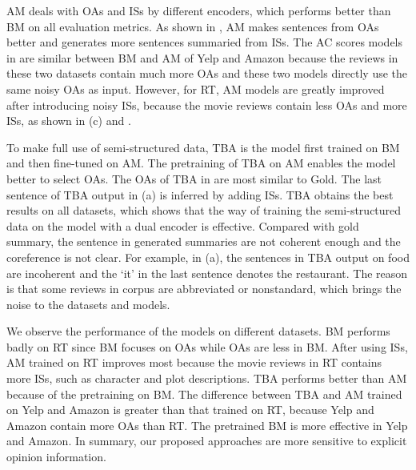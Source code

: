 AM deals with OAs and ISs by different encoders, which performs better than BM on all evaluation metrics. 
As shown in , 
AM makes sentences from OAs better and generates more sentences summaried from ISs.
The AC scores models in  are similar between BM and AM of Yelp and Amazon
because the reviews in these two datasets contain much more OAs
and these two models directly use the same noisy OAs as input.
However, for RT, AM models are greatly improved after introducing noisy ISs, because the movie reviews contain less OAs and more ISs, 
as shown in (c) and .

To make full use of semi-structured data,
TBA is the model first trained on BM and then fine-tuned on AM.
The pretraining of TBA on AM enables the model better to select OAs. 
The OAs of TBA in  are most similar to Gold.
The last sentence of TBA output in (a) is inferred by adding ISs.
TBA obtains the best results on all datasets, which shows
that the way of training the semi-structured data on 
the model with a dual encoder is effective. 
Compared with gold summary, the sentence in generated summaries are not coherent enough 
and the coreference is not clear. For example, in (a), the sentences in TBA output 
on food are incoherent and the `it' in the last sentence denotes the restaurant. The reason is that some reviews in corpus are abbreviated or nonstandard, which brings the noise to the datasets and models.

We observe the performance of the models on different datasets.
BM performs badly on RT since BM focuses on OAs while OAs are less in BM.
After using ISs, AM trained on RT improves most because the movie reviews in RT contains more ISs, such as character and plot descriptions.
TBA performs better than AM because of the pretraining on BM.
The difference between TBA and AM trained on Yelp and Amazon is greater than that trained on RT, 
because Yelp and Amazon contain more OAs than RT.
The pretrained BM is more effective in Yelp and Amazon.
In summary, our proposed approaches are more sensitive to 
explicit opinion information. 


